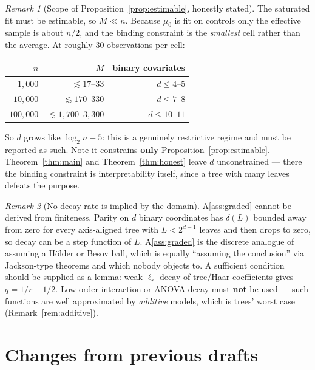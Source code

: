 \documentclass[11pt]{article}
\theoremstyle{plain}
\theoremstyle{definition}
\theoremstyle{remark}
\newtheorem{remark}{Remark}
\newcommand{\mz}{\mu_0}
\begin{document}
\begin{remark}[Scope of Proposition~\ref{prop:estimable}, honestly stated]
\label{rem:scope}
The saturated fit must be estimable, so $M\ll n$. Because $\mz$ is fit on
controls only the effective sample is about $n/2$, and the binding constraint is
the \emph{smallest} cell rather than the average. At roughly $30$ observations
per cell:

\begin{center}
\begin{tabular}{@{}rrr@{}}
\toprule
$n$ & $M$ & binary covariates \\
\midrule
$1{,}000$ & $\lesssim 17\text{--}33$ & $d\le4\text{--}5$ \\
$10{,}000$ & $\lesssim 170\text{--}330$ & $d\le7\text{--}8$ \\
$100{,}000$ & $\lesssim 1{,}700\text{--}3{,}300$ & $d\le10\text{--}11$ \\
\bottomrule
\end{tabular}
\end{center}

So $d$ grows like $\log_2 n-5$: this is a genuinely restrictive regime and must
be reported as such. Note it constrains \textbf{only}
Proposition~\ref{prop:estimable}. Theorem~\ref{thm:main} and
Theorem~\ref{thm:honest} leave $d$ unconstrained --- there the binding constraint
is interpretability itself, since a tree with many leaves defeats the purpose.
\end{remark}

\begin{remark}[No decay rate is implied by the domain]\label{rem:parity}
A\ref{ass:graded} cannot be derived from finiteness. Parity on $d$ binary
coordinates has $\delta(L)$ bounded away from zero for every axis-aligned tree
with $L<2^{d-1}$ leaves and then drops to zero, so decay can be a step function
of $L$. A\ref{ass:graded} is the discrete analogue of assuming a H\"older or
Besov ball, which is equally ``assuming the conclusion'' via Jackson-type
theorems and which nobody objects to. A sufficient condition should be supplied
as a lemma: weak-$\ell_r$ decay of tree/Haar coefficients gives $q=1/r-1/2$.
Low-order-interaction or ANOVA decay must \textbf{not} be used --- such functions
are well approximated by \emph{additive} models, which is trees' worst case
(Remark~\ref{rem:additive}).
\end{remark}

\section{Changes from previous drafts}\label{sec:changes}
\end{document}
